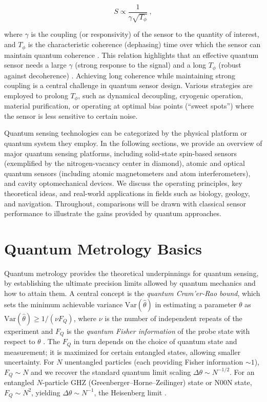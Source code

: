 \begin{equation}\label{eq:sensitivity}

S \propto \frac{1}{\gamma \sqrt{T_{\phi}}}~,

\end{equation}

where $\gamma$ is the coupling (or responsivity) of the sensor to the
quantity of interest, and $T_{\phi}$ is the characteristic coherence
(dephasing) time over which the sensor can maintain quantum coherence
. This relation highlights that an effective quantum sensor needs a
large $\gamma$ (strong response to the signal) and a long $T_{\phi}$
(robust against decoherence) . Achieving long coherence while
maintaining strong coupling is a central challenge in quantum sensor
design. Various strategies are employed to prolong $T_{\phi}$, such as
dynamical decoupling, cryogenic operation, material purification, or
operating at optimal bias points (“sweet spots”) where the sensor is
less sensitive to certain noise.



Quantum sensing technologies can be categorized by the physical
platform or quantum system they employ. In the following sections, we
provide an overview of major quantum sensing platforms, including
solid-state spin-based sensors (exemplified by the nitrogen-vacancy
center in diamond), atomic and optical quantum sensors (including
atomic magnetometers and atom interferometers), and cavity
optomechanical devices. We discuss the operating principles, key
theoretical ideas, and real-world applications in fields such as
biology, geology, and navigation. Throughout, comparisons will be
drawn with classical sensor performance to illustrate the gains
provided by quantum approaches.



\section{Quantum Metrology Basics}\label{sec:metrology}

Quantum metrology provides the theoretical underpinnings for quantum
sensing, by establishing the ultimate precision limits allowed by
quantum mechanics and how to attain them. A central concept is the
\emph{quantum Cram'er-Rao bound}, which sets the minimum achievable
variance $\mathrm{Var}(\hat{\theta})$ in estimating a parameter
$\theta$ as $\mathrm{Var}(\hat{\theta}) \ge 1/(\nu F_Q)$, where $\nu$
is the number of independent repeats of the experiment and $F_Q$ is
the \emph{quantum Fisher information} of the probe state with respect
to $\theta$ . The $F_Q$ in turn depends on the choice of quantum state
and measurement; it is maximized for certain entangled states,
allowing smaller uncertainty. For $N$ unentangled particles (each
providing Fisher information $\sim 1$), $F_Q \sim N$ and we recover
the standard quantum limit scaling $\Delta \theta \sim N^{-1/2}$. For
an entangled $N$-particle GHZ (Greenberger–Horne–Zeilinger) state or
N00N state, $F_Q \sim N^2$, yielding $\Delta \theta \sim N^{-1}$, the
Heisenberg limit .



